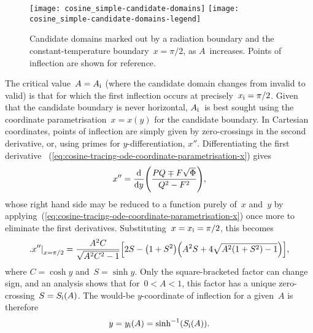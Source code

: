\begin{figure}
  \newcommand*{\legendtrimwidth}{0.1\textwidth}
  \newcommand*{\legendoffsetheight}{0.36\textwidth}
  \centering
  \texttt{[image: cosine\_simple-candidate-domains]}
  \texttt{[image: cosine\_simple-candidate-domains-legend]}
  \caption{
    Candidate domains marked out by a radiation boundary
    and the constant-temperature boundary~$x = \pi/2$,
    as $A$~increases.
    Points of inflection are shown for reference.
  }
  \label{fig:cosine_simple-candidate-domains}
\end{figure}

The critical value~$A = A_{\mathrm{i}}$
(where the candidate domain changes from invalid to valid)
is that for which the first inflection occurs at precisely~$x_{\mathrm{i}} = \pi/2$.
Given that the candidate boundary is never horizontal,
$A_{\mathrm{i}}$~is best sought using the coordinate parametrisation~$x = x (y)$
for the candidate boundary.
In Cartesian coordinates, points of inflection
are simply given by zero-crossings in the second derivative,
or, using primes for $y$-differentiation, $x''$.
Differentiating the first derivative~%
  (\ref{eq:cosine-tracing-ode-coordinate-parametrisation-x})
gives
\begin{equation}
  x'' = \tder{}{y} \roundbr*{\frac{P Q \mp F \sqrt{\Phi}}{Q^2 - F^2}},
  \label{eq:acceleration-traced-boundary-cartesian-by-y}
\end{equation}
whose right hand side may be reduced to a function purely of~$x$ and~$y$
by applying~(\ref{eq:cosine-tracing-ode-coordinate-parametrisation-x})
once more to eliminate the first derivatives.
Substituting~$x = x_{\mathrm{i}} = \pi/2$, this becomes
\begin{equation}
  \eval[\textsize]{x''}_{x=\pi/2} =
    \frac{A^2 C}{\sqrt{A^2 C^2 - 1}}
    \squarebr*{
      2 S - \roundbr*{1 + S^2} \roundbr*{A^2 S + 4 \sqrt{A^2 (1 + S^2) - 1}}
    },
  \label{eq:%
    cosine-simple-traced-boundary-acceleration-cartesian-by-y-inflection%
  }
\end{equation}
where $C = \cosh y$ and~$S = \sinh y$.
Only the square-bracketed factor can change sign,
and an analysis shows that for~$0 < A < 1$,
this factor has a unique zero-crossing~$S = S_{\mathrm{i}} (A)$.
The would-be $y$-coordinate of inflection for a given~$A$ is therefore
\begin{equation}
  y = y_\infl (A) = \sinh^{-1} \roundbr[\bulkysize]{S_\infl (A)}.
  \label{eq:cosine-simple-traced-boundary-y-would-be-inflection}
\end{equation}
